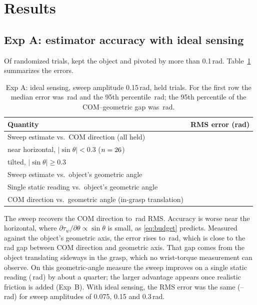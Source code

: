 \documentclass[11pt]{article}
\begin{document}
\section{Results}
\subsection{Exp A: estimator accuracy with ideal sensing}
Of \An{} randomized trials, \Aheld{} kept the object and \Apiv{} pivoted by more than 0.1\,rad. Table~\ref{tab:expA} summarizes the errors.
\begin{table}[h]
\centering\small
\begin{tabular}{lc}
\toprule
Quantity & RMS error (rad) \\
\midrule
Sweep estimate vs.\ COM direction (all held) & \AlsRms{} \\
\quad near horizontal, $|\sin\theta|<0.3$ ($n=26{}$) & \AlsHor{} \\
\quad tilted, $|\sin\theta|\ge 0.3$ & \AlsTilt{} \\
Sweep estimate vs.\ object's geometric angle & \AlsRod{} \\
Single static reading vs.\ object's geometric angle & \AnaiveRod{} \\
COM direction vs.\ geometric angle (in-grasp translation) & \Agap{} \\
\bottomrule
\end{tabular}
\caption{Exp A: ideal sensing, sweep amplitude 0.15\,rad, \Aheld{} held trials. For the first row the median error was \AlsMed{}\,rad and the 95th percentile \AlsPnf{}\,rad; the 95th percentile of the COM--geometric gap was \AgapPnf{}\,rad.}
\label{tab:expA}
\end{table}

The sweep recovers the COM direction to \AlsRms{}\,rad RMS. Accuracy is worse near the horizontal, where $\partial\tau_w/\partial\theta \propto \sin\theta$ is small, as \eqref{eq:budget} predicts. Measured against the object's geometric axis, the error rises to \AlsRod{}\,rad, which is close to the \Agap{}\,rad gap between COM direction and geometric axis. That gap comes from the object translating sideways in the grasp, which no wrist-torque measurement can observe. On this geometric-angle measure the sweep improves on a single static reading (\AnaiveRod{}\,rad) by about a quarter; the larger advantage appears once realistic friction is added (Exp~B). With ideal sensing, the RMS error was the same (\AampLo{}--\AampHi{}\,rad) for sweep amplitudes of 0.075, 0.15 and 0.3\,rad.
\end{document}
